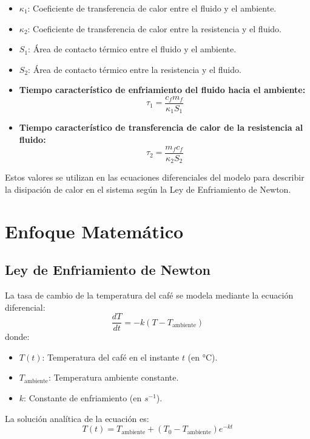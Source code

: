 \documentclass{article}
\begin{document}
\begin{itemize}
    \item \( \kappa_1 \): Coeficiente de transferencia de calor entre el fluido y el ambiente.
    \item \( \kappa_2 \): Coeficiente de transferencia de calor entre la resistencia y el fluido.
    \item \( S_1 \): Área de contacto térmico entre el fluido y el ambiente.
    \item \( S_2 \): Área de contacto térmico entre la resistencia y el fluido.
\end{itemize}

\begin{itemize}
    \item \textbf{Tiempo característico de enfriamiento del fluido hacia el ambiente:}
    \begin{equation}
        \tau_1 = \frac{c_f m_f}{\kappa_1 S_1}
    \end{equation}
    \item \textbf{Tiempo característico de transferencia de calor de la resistencia al fluido:}
    \begin{equation}
        \tau_2 = \frac{m_f c_f}{\kappa_2 S_2}
    \end{equation}
\end{itemize}

Estos valores se utilizan en las ecuaciones diferenciales del modelo para describir la disipación de calor en el sistema según la Ley de Enfriamiento de Newton.
\section{Enfoque Matemático}
\subsection{Ley de Enfriamiento de Newton}
La tasa de cambio de la temperatura del café se modela mediante la ecuación diferencial:
\[
\frac{dT}{dt} = -k(T - T_{\text{ambiente}})
\]
donde:
\begin{itemize}
    \item \(T(t)\): Temperatura del café en el instante \(t\) (en °C).
    \item \(T_{\text{ambiente}}\): Temperatura ambiente constante.
    \item \(k\): Constante de enfriamiento (en \(s^{-1}\)).
\end{itemize}
La solución analítica de la ecuación es:
\[
T(t) = T_{\text{ambiente}} + (T_0 - T_{\text{ambiente}}) e^{-kt}
\]
\end{document}
